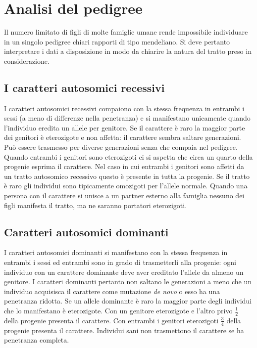\section{Analisi del pedigree}
Il numero limitato di figli di molte famiglie umane rende impossibile individuare in un singolo pedigree chiari rapporti di tipo mendeliano. Si deve pertanto interpretare i dati a disposizione in modo da
chiarire la natura del tratto preso in considerazione.

\subsection{I caratteri autosomici recessivi}
I caratteri autosomici recessivi compaiono con la stessa frequenza in entrambi i sessi (a meno di differenze nella penetranza) e si manifestano unicamente quando l'individuo eredita un allele per genitore.
Se il carattere \`e raro la maggior parte dei genitori \`e eterozigote e non affetta: il carattere sembra saltare generazioni. 
Pu\`o essere trasmesso per diverse generazioni senza che compaia nel pedigree.
Quando entrambi i genitori sono eterozigoti ci si aspetta che circa un quarto della progenie esprima il carattere.
Nel caso in cui entrambi i genitori sono affetti da un tratto autosomico recessivo questo \`e presente in tutta la progenie. 
Se il tratto \`e raro gli individui sono tipicamente omozigoti per l'allele normale. 
Quando una persona con il carattere si unisce a un partner esterno alla famiglia nessuno dei figli manifesta il tratto, ma ne saranno portatori eterozigoti. 

\subsection{Caratteri autosomici dominanti}
I caratteri autosomici dominanti si manifestano con la stessa frequenza in entrambi i sessi ed entrambi sono in grado di trasmetterli alla progenie: ogni individuo con un carattere dominante deve aver ereditato l'allele da almeno un genitore.
I caratteri dominanti pertanto non saltano le generazioni a meno che un individuo acquisisca il carattere come mutazione \emph{de novo} o esso ha una penetranza ridotta.
Se un allele dominante \`e raro la maggior parte degli individui che lo manifestano \`e eterozigote.
Con un genitore eterozigote e l'altro privo $\frac{1}{2}$ della progenie presenta il carattere.
Con entrambi i genitori eterozigoti $\frac{3}{4}$ della progenie presenta il carattere. 
Individui sani non trasmettono il carattere se ha penetranza completa.

